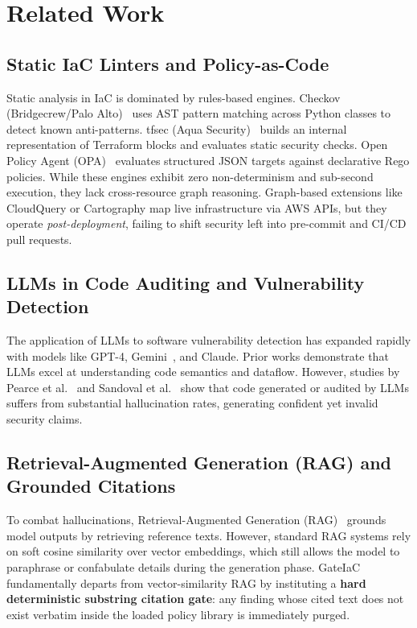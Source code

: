 \documentclass[conference]{IEEEtran}
\begin{document}
\section{Related Work}

\subsection{Static IaC Linters and Policy-as-Code}
Static analysis in IaC is dominated by rules-based engines. Checkov (Bridgecrew/Palo Alto)~\cite{checkov} uses AST pattern matching across Python classes to detect known anti-patterns. tfsec (Aqua Security)~\cite{tfsec} builds an internal representation of Terraform blocks and evaluates static security checks. Open Policy Agent (OPA)~\cite{opa_rego} evaluates structured JSON targets against declarative Rego policies. While these engines exhibit zero non-determinism and sub-second execution, they lack cross-resource graph reasoning. Graph-based extensions like CloudQuery or Cartography map live infrastructure via AWS APIs, but they operate \textit{post-deployment}, failing to shift security left into pre-commit and CI/CD pull requests.

\subsection{LLMs in Code Auditing and Vulnerability Detection}
The application of LLMs to software vulnerability detection has expanded rapidly with models like GPT-4, Gemini~\cite{gemini2025}, and Claude. Prior works demonstrate that LLMs excel at understanding code semantics and dataflow. However, studies by Pearce et al.~\cite{pearce2022asleep} and Sandoval et al.~\cite{sandoval2023lost} show that code generated or audited by LLMs suffers from substantial hallucination rates, generating confident yet invalid security claims.

\subsection{Retrieval-Augmented Generation (RAG) and Grounded Citations}
To combat hallucinations, Retrieval-Augmented Generation (RAG)~\cite{lewis2020rag} grounds model outputs by retrieving reference texts. However, standard RAG systems rely on soft cosine similarity over vector embeddings, which still allows the model to paraphrase or confabulate details during the generation phase. GateIaC fundamentally departs from vector-similarity RAG by instituting a \textbf{hard deterministic substring citation gate}: any finding whose cited text does not exist verbatim inside the loaded policy library is immediately purged.
\end{document}
